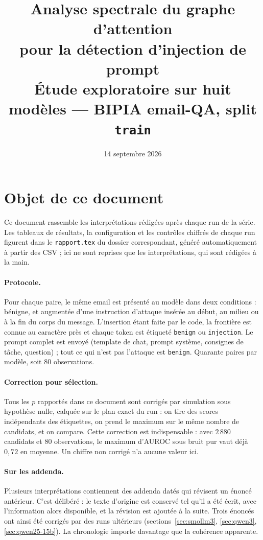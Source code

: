 \documentclass[11pt,a4paper]{article}
\title{Analyse spectrale du graphe d'attention\\
pour la détection d'injection de prompt\\[4pt]
\large Étude exploratoire sur huit modèles --- BIPIA email-QA, split \texttt{train}}
\author{}
\date{14 septembre 2026}
\begin{document}
\maketitle
\tableofcontents
\newpage

\section{Objet de ce document}

Ce document rassemble les interprétations rédigées après chaque run de la série.
Les tableaux de résultats, la configuration et les contrôles chiffrés de chaque
run figurent dans le \texttt{rapport.tex} du dossier correspondant, généré
automatiquement à partir des CSV ; ici ne sont reprises que les interprétations,
qui sont rédigées à la main.

\paragraph{Protocole.} Pour chaque paire, le même email est présenté au modèle
dans deux conditions : bénigne, et augmentée d'une instruction d'attaque insérée
au début, au milieu ou à la fin du corps du message. L'insertion étant faite par
le code, la frontière est connue au caractère près et chaque token est étiqueté
\texttt{benign} ou \texttt{injection}. Le prompt complet est envoyé (template de
chat, prompt système, consignes de tâche, question) ; tout ce qui n'est pas
l'attaque est \texttt{benign}. Quarante paires par modèle, soit 80 observations.

\paragraph{Correction pour sélection.} Tous les $p$ rapportés dans ce document
sont corrigés par simulation sous hypothèse nulle, calquée sur le plan exact du
run : on tire des scores indépendants des étiquettes, on prend le maximum sur le
même nombre de candidats, et on compare. Cette correction est indispensable :
avec $2\,880$ candidats et 80 observations, le maximum d'AUROC sous bruit pur
vaut déjà $0{,}72$ en moyenne. Un chiffre non corrigé n'a aucune valeur ici.

\paragraph{Sur les addenda.} Plusieurs interprétations contiennent des addenda
datés qui révisent un énoncé antérieur. C'est délibéré : le texte d'origine est
conservé tel qu'il a été écrit, avec l'information alors disponible, et la
révision est ajoutée à la suite. Trois énoncés ont ainsi été corrigés par des
runs ultérieurs (sections~\ref{sec:smollm3}, \ref{sec:qwen3},
\ref{sec:qwen25-15b}). La chronologie importe davantage que la cohérence
apparente.
\end{document}
